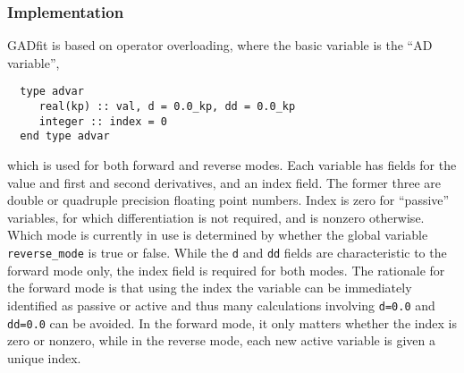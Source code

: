 \documentclass{article}
\begin{document}
\subsubsection{Implementation}

GADfit is based on operator overloading, where the basic variable is
the ``AD variable'',
\begin{verbatim}
  type advar
     real(kp) :: val, d = 0.0_kp, dd = 0.0_kp
     integer :: index = 0
  end type advar
\end{verbatim}
which is used for both forward and reverse modes. Each variable has
fields for the value and first and second derivatives, and an index
field. The former three are double or quadruple precision floating
point numbers. Index is zero for ``passive'' variables, for which
differentiation is not required, and is nonzero otherwise. Which mode
is currently in use is determined by whether the global variable
\verb+reverse_mode+ is true or false. While the \texttt{d} and
\texttt{dd} fields are characteristic to the forward mode only, the
index field is required for both modes. The rationale for the forward
mode is that using the index the variable can be immediately
identified as passive or active and thus many calculations involving
\texttt{d=0.0} and \texttt{dd=0.0} can be avoided. In the forward
mode, it only matters whether the index is zero or nonzero, while in
the reverse mode, each new active variable is given a unique index.
\end{document}
